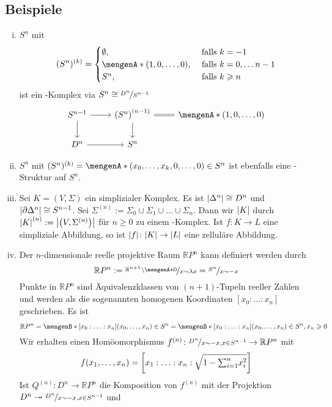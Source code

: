 \subsection[Beispiele für \CW-Komplexe]{Beispiele} %
\label{sub:114}
\begin{enumerate}[(i)]
	\item $S^n$ mit 
	\[
		(S^n)^{(k)} = \begin{cases}
			\emptyset, &\text{ falls }k=-1\\
			\set{(1,0,\ldots ,0)}, &\text{ falls } k=0, \ldots n-1 \\
			S^n , &\text{ falls } k \ge n 
		\end{cases}
	\]
	ist ein \CW-Komplex via $S^n \cong \nicefrac{D^n}{S^{n-1}}$
	\[
		\begin{tikzcd}
			S^{n-1} \rar \dar & \enbrace*{S^n}^{(n-1)} \rar[equal] \dar & \set{(1,0,\ldots ,0)}   \\
			D^n \rar & S^n  
		\end{tikzcd}
	\]
	\item $S^n$ mit $(S^n)^{(k)} = \set{(x_0, \ldots ,x_k,0, \ldots ,0) \in S^n} $ ist ebenfalls eine \CW-Struktur auf $S^n$.
	\item Sei $K=(V,\Sigma)$ ein simplizialer Komplex. Es ist $\abs*{\Delta^n} \cong D^n$ und $\abs*{\partial \Delta^n} \cong S^{n-1}$. Sei 
	$\Sigma^{(n)} := \Sigma_0 \cup \Sigma_1 \cup \ldots \cup \Sigma_n$. Dann wir $\abs*{K}$ durch $\abs*{K}^{(n)} := \abs*{\enbrace*{V,\Sigma^{(n)}}}$ für $n \ge 0$ zu 
	einem \CW-Komplex. Ist $f \colon K \to L$ eine simpliziale Abbildung, so ist $\abs*{f} \colon \abs*{K} \to \abs*{L}$ eine zelluläre Abbildung.
	\item Der $n$-dimensionale reelle projektive Raum $\mathds{R}P^n$ kann definiert werden durch 
	\[
		\mathds{R}P^n := \nicefrac{\mathds{R}^{n+1} \setminus \set{0}}{x \sim \lambda x} = \nicefrac{S^n}{x \sim -x}
	\]
	Punkte in $\mathds{R}P^n$ sind Äquivalenzklassen von $(n+1)$-Tupeln reeller Zahlen und werden als die sogenannten homogenen Koordinaten $[x_0 : \ldots : x_n]$ 
	geschrieben. Es ist 
	\[
		\mathds{R}P^n = \set[{[x_0 : \ldots : x_n]}]{(x_0, \ldots ,x_n) \in S^n \rule{0cm}{1em}} 
		= \set[{[x_0 : \ldots : x_n]}]{(x_0, \ldots ,x_n) \in S^n, x_n \ge 0 \rule{0cm}{1em}}
	\]
	Wir erhalten einen Homöomorphismus $f^{(n)} \colon \nicefrac{D^n}{x \sim -x, x \in S^{n-1}} \to \mathds{R}P^n$ mit
	\[
		f \enbrace*{x_1, \ldots ,x_n} = \benbrace*{x_1 : \ldots : x_n : \sqrt{1- {\textstyle\sum\nolimits_{i=1}^{n}} x_i^2}} 
	\]
	Ist $Q^{(n)} : D^n \to \mathds{R}P^n$ die Komposition von $f^{(n)}$ mit der Projektion $D^n \twoheadrightarrow \nicefrac{D^n}{x \sim -x, x \in S^{n-1}}$ und 

\end{enumerate}
